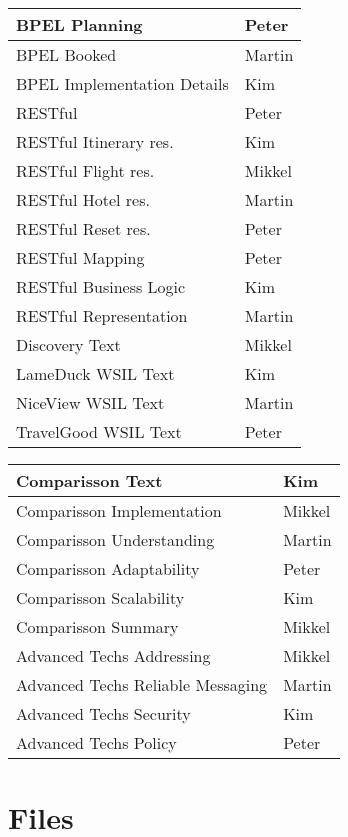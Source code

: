 \begin{tabular}{|l|l|}
\hline BPEL Planning & Peter  \\ 
\hline BPEL Booked & Martin \\ 
\hline BPEL Implementation Details & Kim \\ 
\hline RESTful & Peter  \\ 
\hline RESTful Itinerary res. &  Kim \\ 
\hline RESTful Flight res. & Mikkel \\ 
\hline RESTful Hotel res. & Martin \\ 
\hline RESTful Reset res. & Peter \\ 
\hline RESTful Mapping & Peter  \\ 
\hline RESTful Business Logic & Kim \\ 
\hline RESTful Representation & Martin  \\
\hline Discovery Text & Mikkel  \\
\hline LameDuck WSIL Text & Kim  \\
\hline NiceView WSIL Text & Martin \\
\hline TravelGood WSIL Text & Peter \\

\hline
\end{tabular}

\begin{tabular}{|l|l|}
\hline Comparisson Text & Kim  \\
\hline Comparisson Implementation & Mikkel \\
\hline Comparisson Understanding & Martin   \\
\hline Comparisson Adaptability & Peter \\
\hline Comparisson Scalability & Kim \\
\hline Comparisson Summary & Mikkel\\
\hline Advanced Techs Addressing  & Mikkel \\
\hline Advanced Techs Reliable Messaging & Martin \\
\hline Advanced Techs Security & Kim \\
\hline Advanced Techs Policy & Peter \\
\hline 
\end{tabular} 

\section{Files}

